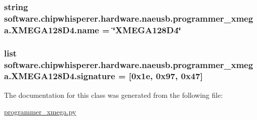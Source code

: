 \subsubsection[{name}]{\setlength{\rightskip}{0pt plus 5cm}string software.\+chipwhisperer.\+hardware.\+naeusb.\+programmer\+\_\+xmega.\+X\+M\+E\+G\+A128\+D4.\+name = \char`\"{}X\+M\+E\+G\+A128\+D4\char`\"{}\hspace{0.3cm}{\ttfamily [static]}}\label{classsoftware_1_1chipwhisperer_1_1hardware_1_1naeusb_1_1programmer__xmega_1_1XMEGA128D4_ac4071eb86a6637805093cb8fb9712c3c}
\hypertarget{classsoftware_1_1chipwhisperer_1_1hardware_1_1naeusb_1_1programmer__xmega_1_1XMEGA128D4_a8052ecbb3c75bea622ecf5d842d136f5}{}
\subsubsection[{signature}]{\setlength{\rightskip}{0pt plus 5cm}list software.\+chipwhisperer.\+hardware.\+naeusb.\+programmer\+\_\+xmega.\+X\+M\+E\+G\+A128\+D4.\+signature = \mbox{[}0x1e, 0x97, 0x47\mbox{]}\hspace{0.3cm}{\ttfamily [static]}}\label{classsoftware_1_1chipwhisperer_1_1hardware_1_1naeusb_1_1programmer__xmega_1_1XMEGA128D4_a8052ecbb3c75bea622ecf5d842d136f5}


The documentation for this class was generated from the following file\+:\begin{DoxyCompactItemize}
\item 
\hyperlink{programmer__xmega_8py}{programmer\+\_\+xmega.\+py}\end{DoxyCompactItemize}

